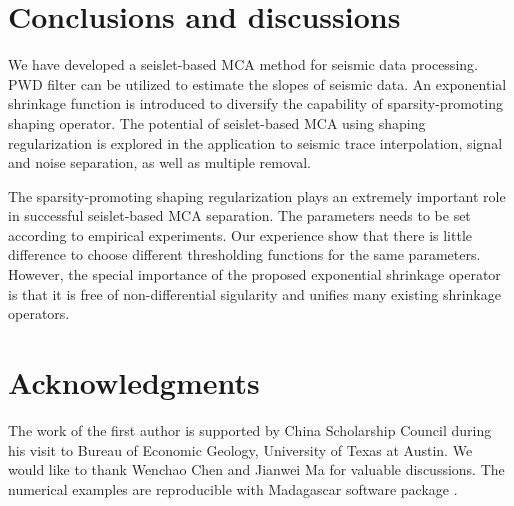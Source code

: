 

  
\section{Conclusions and discussions}

We have developed a seislet-based MCA method for seismic data processing. PWD filter can be utilized to estimate the slopes of seismic data. An exponential shrinkage function is introduced to diversify the capability of sparsity-promoting shaping operator. The potential of seislet-based MCA using shaping regularization is explored in the application to seismic trace interpolation, signal and noise separation, as well as multiple removal. 

The sparsity-promoting shaping regularization plays an extremely important role in successful seislet-based MCA separation. The parameters needs to be set according to empirical experiments.  Our experience show that there is little difference to choose different thresholding functions for the same parameters. However, the special importance of the proposed exponential shrinkage operator is that it is free of non-differential sigularity and unifies many existing shrinkage operators.


\section*{Acknowledgments}

The work of the first author is supported by China Scholarship Council during his visit to Bureau of Economic Geology, University of Texas at Austin. We would like to thank Wenchao Chen and Jianwei Ma for valuable discussions. The numerical examples are reproducible with  Madagascar software package \citep{m8r}.

